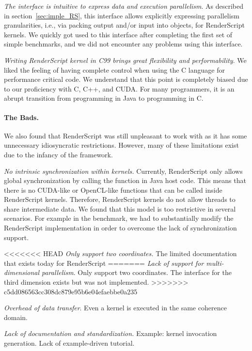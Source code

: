 \textit{The  interface is intuitive to express data and
execution parallelism}. As described in section~\ref{sec:imple_RS}, this
 interface allows explicitly expressing parallelism
granularities, i.e., via packing output and/or input into  objects,
for RenderScript kernels.  We quickly got used to this interface
after completing the first set of simple benchmarks, and we did not encounter
any problems using this interface.

\textit{Writing RenderScript kernel in C99 brings great flexibility and
performability}. We
liked the feeling of having complete control when using
the C language for performance critical code. We understand that this point is
completely biased due to our proficiency with C, C++, and CUDA. For many
programmers, it is an abrupt transition from programming in Java to programming
in C.


\paragraph{The Bads.} We also found that RenderScript was still unpleasant to work with as it has some unnecessary idiosyncratic restrictions. However, many of these limitations exist due to the
infancy of the framework.

\textit{No intrinsic synchronization within kernels.} Currently, RenderScript
only allows global synchronization by calling the  function in
Java host code. This means that there is no CUDA-like  or
OpenCL-like  functions that can be called inside RenderScript
kernels. Therefore, RenderScript kernels do not allow threads to share
intermediate data. We found that this model is too restrictive in several
scenarios. For example in the  benchmark, we had to substantially
modify the RenderScript  implementation in order
to overcome the lack of
synchronization support.

<<<<<<< HEAD
\textit{Only support two coordinates.} The limited documentation that exists today for RenderScript
=======
\textit{Lack of support for multi-dimensional parallelism}. Only support two
coordinates. The interface for the third dimension exists but was not
implemented.
>>>>>>> c5dd086563cc308dc879e95b6e04efaebbe0a235

\textit{Overhead of data transfer}. Even a kernel is executed in the same
coherence domain.

\textit{Lack of documentation and standardization.} Example: kernel invocation
generation. Lack of example-driven tutorial.


